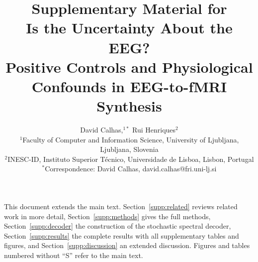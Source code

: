 \documentclass[]{imag-ms-template}
\title{Supplementary Material for\\Is the Uncertainty About the EEG?\\Positive Controls and Physiological Confounds in EEG-to-fMRI Synthesis}
\author{David Calhas,$^{1\ast}$ Rui Henriques$^{2}$\\
{\small $^{1}$Faculty of Computer and Information Science, University of Ljubljana, Ljubljana, Slovenia}\\
{\small $^{2}$INESC-ID, Instituto Superior T\'{e}cnico, Universidade de Lisboa, Lisbon, Portugal}\\
{\small $^\ast$Correspondence: David Calhas, david.calhas@fri.uni-lj.si}
}
\date{}
\begin{document}
\maketitle

This document extends the main text. Section~\ref{supp:related} reviews related work in more detail, Section~\ref{supp:methods} gives the full methods, Section~\ref{supp:decoder} the construction of the stochastic spectral decoder, Section~\ref{supp:results} the complete results with all supplementary tables and figures, and Section~\ref{supp:discussion} an extended discussion. Figures and tables numbered without ``S'' refer to the main text.



\printbibliography
\end{document}
